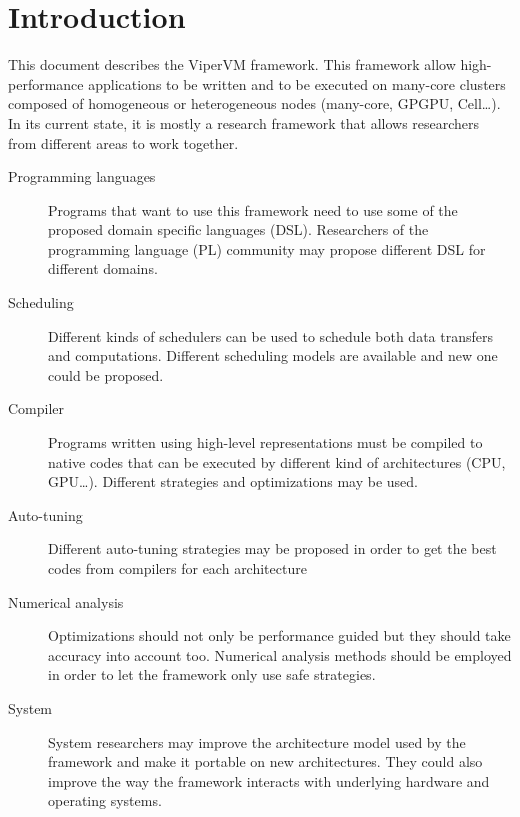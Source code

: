 \chapter{Introduction}

This document describes the ViperVM framework.
This framework allow high-performance applications to be written and to be executed on many-core clusters composed of homogeneous or heterogeneous nodes (many-core, GPGPU, Cell\ldots).
In its current state, it is mostly a research framework that allows researchers from different areas to work together.
\begin{description}
  \item[Programming languages] Programs that want to use this framework need to use some of the proposed domain specific languages (DSL).
        Researchers of the programming language (PL) community may propose different DSL for different domains.
  \item[Scheduling] Different kinds of schedulers can be used to schedule both data transfers and computations.
        Different scheduling models are available and new one could be proposed.
  \item[Compiler] Programs written using high-level representations must be compiled to native codes that can be executed by different kind of architectures (CPU, GPU\ldots).
        Different strategies and optimizations may be used.
  \item[Auto-tuning] Different auto-tuning strategies may be proposed in order to get the best codes from compilers for each architecture
  \item[Numerical analysis] Optimizations should not only be performance guided but they should take accuracy into account too.
        Numerical analysis methods should be employed in order to let the framework only use safe strategies.
  \item[System] System researchers may improve the architecture model used by the framework and make it portable on new architectures.
        They could also improve the way the framework interacts with underlying hardware and operating systems.
\end{description}
